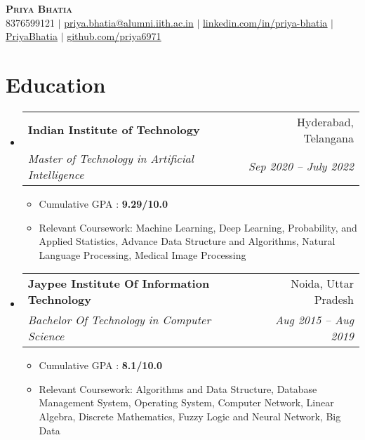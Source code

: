 \documentclass[letterpaper,11pt]{article}
\makeatletter
\newcommand{\resumeItem}[1]{
  \item\small{
    {#1 \vspace{-2pt}}
  }
}
\newcommand{\resumeSubheading}[4]{
  \vspace{-2pt}\item
    \begin{tabular*}{0.97\textwidth}[t]{l@{\extracolsep{\fill}}r}
      \textbf{#1} & #2 \\
      \textit{\small#3} & \textit{\small #4} \\
    \end{tabular*}\vspace{-7pt}
}
\newcommand{\resumeSubHeadingListStart}{\begin{itemize}[leftmargin=0.15in, label={}]}
\newcommand{\resumeSubHeadingListEnd}{\end{itemize}}
\newcommand{\resumeItemListStart}{\begin{itemize}}
\newcommand{\resumeItemListEnd}{\end{itemize}\vspace{-5pt}}
\makeatother
\begin{document}

\begin{center}
    \textbf{\Huge \scshape Priya Bhatia} \\ \vspace{1pt}
    \small 8376599121 $|$ \href{mailto:priya.bhatia6971@gmail.com}{{priya.bhatia@alumni.iith.ac.in}} $|$ 
    \href{https://www.linkedin.com/in/bhatia-priya/}{{\underline{linkedin.com/in/priya-bhatia}}} $|$
    \href{https://www.youtube.com/c/PriyaBhatia}{{\underline{PriyaBhatia}}} $|$
    \href{https://github.com/priya6971}{{\underline{github.com/priya6971}}}
    
    
\end{center}


\section{Education}
  \resumeSubHeadingListStart
    \resumeSubheading
      {Indian Institute of Technology}{ Hyderabad, Telangana}
      {Master of Technology in Artificial Intelligence}{Sep 2020 -- July 2022}
      \resumeItemListStart
        \resumeItem{Cumulative GPA : \textbf{9.29/10.0}}
        \resumeItem{Relevant Coursework: Machine Learning, Deep Learning, Probability, and Applied Statistics, Advance Data Structure and Algorithms, Natural Language Processing, Medical Image Processing}
      \resumeItemListEnd
    \resumeSubheading
      {Jaypee Institute Of Information Technology}{Noida, Uttar Pradesh}
      {Bachelor Of Technology in Computer Science}{Aug 2015 -- Aug 2019}
       \resumeItemListStart
        \resumeItem{Cumulative GPA : \textbf{8.1/10.0}}
        \resumeItem{Relevant Coursework: Algorithms and Data Structure, Database Management System, Operating System, Computer Network, Linear Algebra, Discrete Mathematics, Fuzzy Logic and Neural Network, Big Data}
      \resumeItemListEnd
  \resumeSubHeadingListEnd


\end{document}
